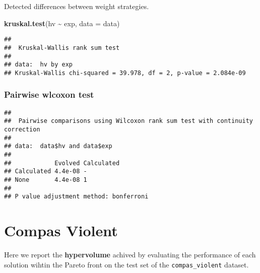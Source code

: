 \documentclass[
]{book}
\newenvironment{Shaded}{\begin{snugshade}}{\end{snugshade}}
\newcommand{\AttributeTok}[1]{\textcolor[rgb]{0.13,0.29,0.53}{#1}}
\newcommand{\ConstantTok}[1]{\textcolor[rgb]{0.56,0.35,0.01}{#1}}
\newcommand{\FunctionTok}[1]{\textcolor[rgb]{0.13,0.29,0.53}{\textbf{#1}}}
\newcommand{\NormalTok}[1]{#1}
\newcommand{\SpecialCharTok}[1]{\textcolor[rgb]{0.81,0.36,0.00}{\textbf{#1}}}
\newcommand{\StringTok}[1]{\textcolor[rgb]{0.31,0.60,0.02}{#1}}
\begin{document}
Detected differences between weight strategies.

\begin{Shaded}
\begin{Highlighting}[]
\FunctionTok{kruskal.test}\NormalTok{(hv }\SpecialCharTok{\textasciitilde{}}\NormalTok{ exp, }\AttributeTok{data =}\NormalTok{ data)}
\end{Highlighting}
\end{Shaded}

\begin{verbatim}
## 
##  Kruskal-Wallis rank sum test
## 
## data:  hv by exp
## Kruskal-Wallis chi-squared = 39.978, df = 2, p-value = 2.084e-09
\end{verbatim}

\hypertarget{pairwise-wlcoxon-test-5}{%
\subsection{Pairwise wlcoxon test}\label{pairwise-wlcoxon-test-5}}

\begin{Shaded}
\end{Shaded}

\begin{verbatim}
## 
##  Pairwise comparisons using Wilcoxon rank sum test with continuity correction 
## 
## data:  data$hv and data$exp 
## 
##            Evolved Calculated
## Calculated 4.4e-08 -         
## None       4.4e-08 1         
## 
## P value adjustment method: bonferroni
\end{verbatim}

\hypertarget{compas-violent}{%
\chapter{Compas Violent}\label{compas-violent}}

Here we report the \textbf{hypervolume} achived by evaluating the performance of each solution wihtin the Pareto front on the test set of the \texttt{compas\_violent} dataset.
\end{document}
